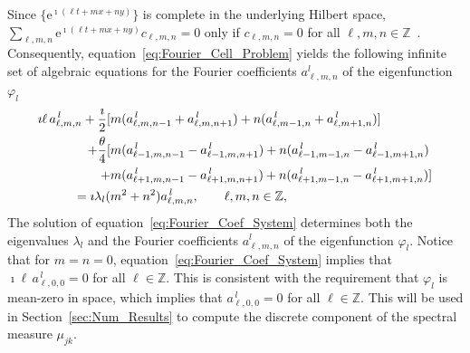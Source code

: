 \documentclass[leqno,onefignum,onetabnum]{siamltex1213}
\newcommand{\secref}[1]{Section~\ref{#1}}
\newcommand{\e}{\mathrm{e}}
\begin{document}
%
Since $\{\e^{\imath(\ell t+mx+ny)}\}$ is complete in the
underlying Hilbert space, $\sum_{\ell,m,n} \e^{\imath(\ell t+mx+ny)}c_{\ell,m,n}=0$
only if $c_{\ell,m,n}=0$ for all $\ell,m,n\in\mathbb{Z}$~\cite{Stone:64}.
Consequently, equation~\eqref{eq:Fourier_Cell_Problem} yields the
following infinite set of algebraic equations for the Fourier
coefficients $a^l_{\ell,m,n}$ of the eigenfunction $\varphi_l$ 
%
\begin{align}\label{eq:Fourier_Coef_System}
\imath \ell\,a^{\,l}_{\ell,m,n}+\frac{\imath}{2}
[&m(a^{\,l}_{\ell,m,n-1}+a^{\,l}_{\ell,m,n+1})+n(a^{\,l}_{\ell,m-1,n}+a^{\,l}_{\ell,m+1,n})]
\\
+\frac{\theta}{4}[&m(a^{\,l}_{\ell-1,m,n-1}-a^{\,l}_{\ell-1,m,n+1})+n(a^{\,l}_{\ell-1,m-1,n}-a^{\,l}_{\ell-1,m+1,n})
\notag\\
+&m(a^{\,l}_{\ell+1,m,n-1}-a^{\,l}_{\ell+1,m,n+1})+n(a^{\,l}_{\ell+1,m-1,n}-a^{\,l}_{\ell+1,m+1,n})]
\notag\\
=\imath\lambda_l(&m^2+n^2)a^{\,l}_{\ell,m,n}, \qquad \ell,m,n\in\mathbb{Z},
\notag
\end{align}
%
The solution of equation~\eqref{eq:Fourier_Coef_System} determines
both the eigenvalues $\lambda_l$ and the Fourier coefficients $a^l_{\ell,m,n}$
of the eigenfunction $\varphi_l$. Notice that for $m=n=0$,
equation~\eqref{eq:Fourier_Coef_System} implies that
$\imath \ell\,a^{\,l}_{\ell,0,0}=0$ for all $\ell\in\mathbb{Z}$. This is consistent
with the requirement that $\varphi_l$ is mean-zero in space, which implies
that $a^{\,l}_{\ell,0,0}=0$ for all $\ell\in\mathbb{Z}$. This will be used in
\secref{sec:Num_Results} to compute the discrete component of the
spectral measure $\mu_{jk}$. 
\end{document}
